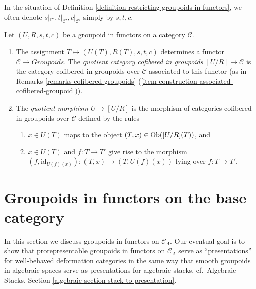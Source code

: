 \begin{remark}
\label{remark-notation-restriction}
In the situation of Definition
\ref{definition-restricting-groupoids-in-functors}, we often denote
$s|_{\mathcal{C}'}, t|_{\mathcal{C}'}, c|_{\mathcal{C}'}$ simply by $s, t, c$.
\end{remark}

\begin{definition}
\label{definition-quotient}
Let $(U, R, s, t, c)$ be a groupoid in functors on a category $\mathcal{C}$.
\begin{enumerate}
\item The assignment $T \mapsto  (U(T), R(T), s, t, c)$ determines a functor
$\mathcal{C} \to \textit{Groupoids}$. The {\it quotient category
cofibered in groupoids $[U/R] \to \mathcal{C}$} is the category
cofibered in groupoids over $\mathcal{C}$ associated to this functor (as in
Remarks \ref{remarks-cofibered-groupoids}
(\ref{item-construction-associated-cofibered-groupoid})).
\item The {\it quotient morphism $U \to [U/R]$} is the morphism of
categories cofibered in groupoids over $\mathcal{C}$ defined by the
rules
\begin{enumerate}
\item $x \in U(T)$ maps to the object $(T, x) \in \mathop{\mathrm{Ob}}\nolimits([U/R](T))$, and
\item $x \in U(T)$ and $f : T \to T'$ give rise to the morphism
$(f, \text{id}_{U(f)(x)}): (T, x) \to (T, U(f)(x))$ lying over
$f : T \to T'$.
\end{enumerate}
\end{enumerate}
\end{definition}





\section{Groupoids in functors on the base category}
\label{section-prorepresentable-groupoids-in-functors}

\noindent
In this section we discuss groupoids in functors on $\mathcal{C}_\Lambda$.
Our eventual goal is to show that prorepresentable groupoids
in functors on $\mathcal{C}_\Lambda$ serve as ``presentations''
for well-behaved deformation categories in the same way that
smooth groupoids in algebraic spaces serve as presentations for
algebraic stacks,
cf.\ Algebraic Stacks, Section \ref{algebraic-section-stack-to-presentation}.

